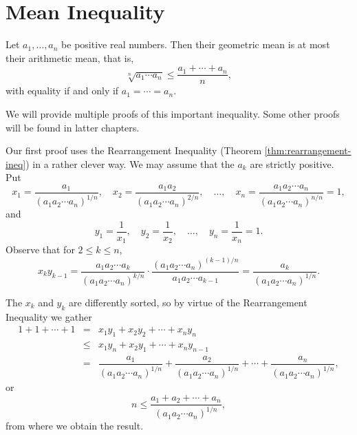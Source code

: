 \documentclass[11pt, openany]{book}
\theoremstyle{change} \theoremheaderfont{\blue\sffamily\bfseries}
\newcommand{\proofsymbol}{\Pisymbol{pzd}{113}}
\theoremstyle{nonumberplain} \theoremheaderfont{\sffamily\bfseries}
\newenvironment{f-pf}[0]{\itshape\begin{quote}{\bf First Proof: \ }}{\proofsymbol\end{quote}}
\newcommand{\í}{\'{\i}}
\begin{document}
\section{Mean Inequality}
\begin{thm}\label{thm:AMGM-ineq}
Let $a_{1}, \dots, a_{n}$ be positive real numbers. Then their
geometric mean is at most their arithmetic mean, that is,
    $$
   \sqrt[n]{a_{1}\cdots a_{n}} \leq  \dfrac{a_{1} + \cdots + a_{n}}{n},
    $$
    with equality if and only if $a_{1} = \cdots = a_{n}$.
\end{thm}
We will provide multiple proofs of this important inequality. Some
other proofs will be found in latter chapters.
\begin{f-pf}
Our first  proof uses the Rearrangement Inequality (Theorem
\ref{thm:rearrangement-ineq}) in a rather clever way. We may assume
that the $a_k$ are strictly positive. Put
$$x_1=\dfrac{a_1}{(a_1a_2\cdots a_n)^{1/n}}, \quad x_2=\dfrac{a_1a_2}{(a_1a_2\cdots
a_n)^{2/n}},\quad  \ldots ,\quad  x_n=\dfrac{a_1a_2\cdots
a_n}{(a_1a_2\cdots a_n)^{n/n}}=1,
$$
and$$ y_1 = \dfrac{1}{x_1}, \quad y_2 = \dfrac{1}{x_2},\quad \ldots
,\quad y_n = \dfrac{1}{x_n}=1.
$$
Observe that for $2 \leq k \leq n$, $$x_ky_{k-1} =
\dfrac{a_1a_2\cdots a_k}{(a_1a_2\cdots a_n)^{k/n}}\cdot
\dfrac{(a_1a_2\cdots a_n)^{(k-1)/n}} {a_1a_2\cdots a_{k-1}} =
\dfrac{a_k}{(a_1a_2\cdots a_n)^{1/n}}.$$

The $x_k$ and $y_k$ are differently sorted, so by virtue of the
Rearrangement Inequality we gather
$$\begin{array}{lll} 1+1+\cdots + 1 & = & x_1y_1+x_2y_2+\cdots + x_ny_n \\
& \leq  & x_1y_n+x_2y_{1}+\cdots + x_ny_{n-1} \\
& = & \dfrac{a_1}{(a_1a_2\cdots a_n)^{1/n}}+
\dfrac{a_2}{(a_1a_2\cdots a_n)^{1/n}} + \cdots +
\dfrac{a_n}{(a_1a_2\cdots a_n)^{1/n}},
 \end{array}$$
 or $$ n \leq \dfrac{a_1+a_2+\cdots + a_n}{(a_1a_2\cdots a_n)^{1/n}},
 $$from where we obtain the result.
\end{f-pf}
\end{document}
